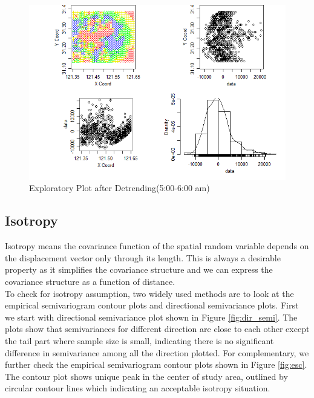 \documentclass[hidelinks,12pt]{article}
\begin{document}
	\begin{figure}[!ht]
		\includegraphics[width=\textwidth]{gres5.png}
		\caption{Exploratory Plot after Detrending(5:00-6:00 am)\label{fig:gres5}}
	\end{figure}
	\FloatBarrier
	
	
	
	\subsection{Isotropy}\label{sec:anis}
	Isotropy means the covariance function of the spatial random variable depends on the displacement vector only through its length. This is always a desirable property as it simplifies the covariance structure and we can express the covariance structure as a function of distance. \\
	
	To check for isotropy assumption, two widely used methods are to look at the empirical semivariogram contour plots and directional semivariance plots. First we start with directional semivariance plot shown in Figure \ref{fig:dir_semi}. The plots show that semivariances for different direction are close to each other except the tail part where sample size is small, indicating there is no significant difference in semivariance among all the direction plotted. For complementary, we further check the empirical semivariogram contour plots shown in Figure \ref{fig:esc}. The contour plot shows unique peak in the center of study area, outlined by circular contour lines which indicating an acceptable isotropy situation.
	
\end{document}
